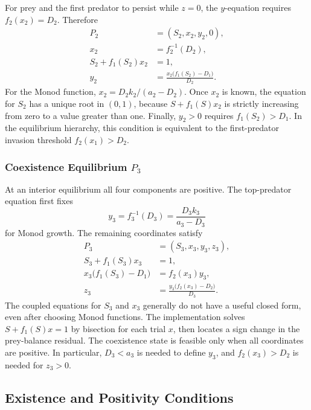 For prey and the first predator to persist while \(z=0\), the \(y\)-equation
requires \(f_2(x_2)=D_2\).  Therefore
\begin{equation}
\label{eq:p2}
\begin{aligned}
P_2&=(S_2,x_2,y_2,0),\\
x_2&=f_2^{-1}(D_2),\\
S_2+f_1(S_2)x_2&=1,\\
y_2&=\frac{x_2\bigl(f_1(S_2)-D_1\bigr)}{D_2}.
\end{aligned}
\end{equation}
For the Monod function, \(x_2=D_2k_2/(a_2-D_2)\).  Once \(x_2\) is known,
the equation for \(S_2\) has a unique root in \((0,1)\), because
\(S+f_1(S)x_2\) is strictly increasing from zero to a value greater than one.
Finally, \(y_2>0\) requires \(f_1(S_2)>D_1\).  In the equilibrium hierarchy,
this condition is equivalent to the first-predator invasion threshold
\(f_2(x_1)>D_2\).

\subsubsection{Coexistence Equilibrium \(P_3\)}

At an interior equilibrium all four components are positive.  The top-predator
equation first fixes
\begin{equation}
\label{eq:y3}
y_3=f_3^{-1}(D_3)
=\frac{D_3k_3}{a_3-D_3}
\end{equation}
for Monod growth.  The remaining coordinates satisfy
\begin{equation}
\label{eq:p3}
\begin{aligned}
P_3&=(S_3,x_3,y_3,z_3),\\
S_3+f_1(S_3)x_3&=1,\\
x_3\bigl(f_1(S_3)-D_1\bigr)&=f_2(x_3)y_3,\\
z_3&=\frac{y_3\bigl(f_2(x_3)-D_2\bigr)}{D_3}.
\end{aligned}
\end{equation}
The coupled equations for \(S_3\) and \(x_3\) generally do not have a useful
closed form, even after choosing Monod functions.  The implementation solves
\(S+f_1(S)x=1\) by bisection for each trial \(x\), then locates a sign change
in the prey-balance residual.  The coexistence state is feasible only when all
coordinates are positive.  In particular, \(D_3<a_3\) is needed to define
\(y_3\), and \(f_2(x_3)>D_2\) is needed for \(z_3>0\).

\subsection{Existence and Positivity Conditions}

